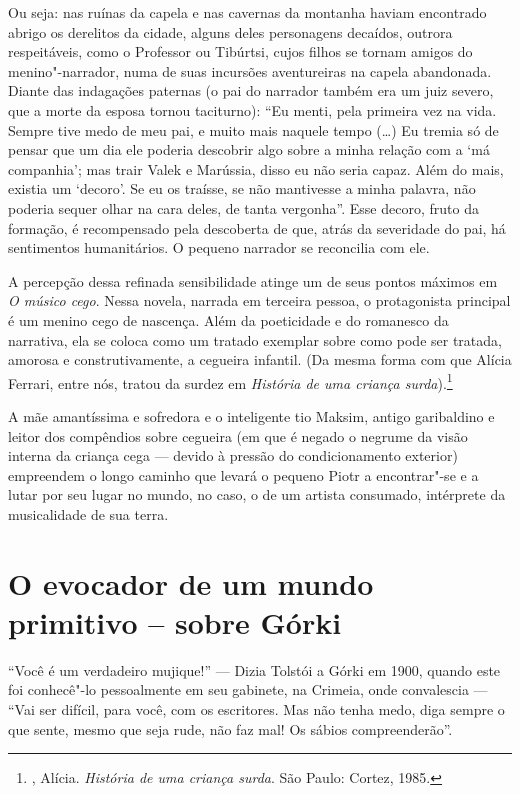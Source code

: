 Ou seja: nas ruínas da capela e nas cavernas da montanha haviam
encontrado abrigo os derelitos da cidade, alguns deles personagens
decaídos, outrora respeitáveis, como o Professor ou Tibúrtsi, cujos
filhos se tornam amigos do menino"-narrador, numa de suas incursões
aventureiras na capela abandonada. Diante das indagações paternas (o pai
do narrador também era um juiz severo, que a morte da esposa tornou
taciturno): ``Eu menti, pela primeira vez na vida. Sempre tive medo de
meu pai, e muito mais naquele tempo (\ldots{}) Eu tremia só de pensar que um
dia ele poderia descobrir algo sobre a minha relação com a `má
companhia'; mas trair Valek e Marússia, disso eu não seria capaz. Além
do mais, existia um `decoro'. Se eu os traísse, se não mantivesse a
minha palavra, não poderia sequer olhar na cara deles, de tanta
vergonha''. Esse decoro, fruto da formação, é recompensado pela
descoberta de que, atrás da severidade do pai, há sentimentos
humanitários. O pequeno narrador se reconcilia com ele.

A percepção dessa refinada sensibilidade atinge um de seus pontos
máximos em \emph{O músico cego}. Nessa novela, narrada em terceira
pessoa, o protagonista principal é um menino cego de nascença. Além da
poeticidade e do romanesco da narrativa, ela se coloca como um tratado
exemplar sobre como pode ser tratada, amorosa e construtivamente, a
cegueira infantil. (Da mesma forma com que Alícia Ferrari, entre nós,
tratou da surdez em \emph{História de uma criança surda}).\footnote{,
  Alícia. \emph{História de uma criança surda}. São Paulo: Cortez, 1985.}

A mãe amantíssima e sofredora e o inteligente tio Maksim, antigo
garibaldino e leitor dos compêndios sobre cegueira (em que é negado o
negrume da visão interna da criança cega --- devido à pressão do
condicionamento exterior) empreendem o longo caminho que levará o
pequeno Piotr a encontrar"-se e a lutar por seu lugar no mundo, no caso,
o de um artista consumado, intérprete da musicalidade de sua terra.

\chapter{O evocador de um mundo primitivo -- sobre Górki}

``Você é um verdadeiro mujique!'' --- Dizia Tolstói a Górki em 1900,
quando este foi conhecê"-lo pessoalmente em seu gabinete, na Crimeia, onde convalescia --- ``Vai ser
difícil, para você, com os escritores. Mas não tenha medo, diga sempre o
que sente, mesmo que seja rude, não faz mal! Os sábios compreenderão''.

